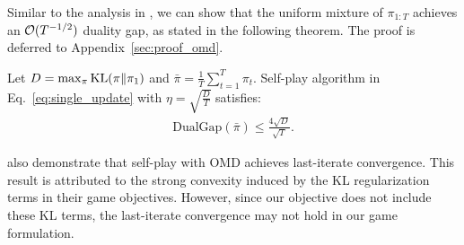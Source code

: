 
Similar to the analysis in \citet{zhang2024iterative}, we can show that the uniform mixture of $\pi_{1:T}$ achieves an $\mathcal O(T^{-1/2})$ duality gap, as stated in the following theorem. The proof is deferred to Appendix~\ref{sec:proof_omd}.
\begin{theorem}\label{thm:omd_guarantee}
Let $D=\max_{\pi} \mathrm{KL}(\pi \Vert \pi_1)$ and $\bar \pi=\frac{1}{T}\sum_{t=1}^T \pi_t$. Self-play algorithm in Eq.~\eqref{eq:single_update} with $\eta=\sqrt{\frac{D}{T}}$ satisfies:
\begin{align*}
\mathrm{DualGap}(\bar \pi) \le \frac{4\sqrt{D}}{\sqrt{T}}.
\end{align*}
\end{theorem}
\citet{zhang2024iterative} also demonstrate that self-play with OMD achieves last-iterate convergence. This result is attributed to the strong convexity induced by the KL regularization terms in their game objectives. However, since our objective does not include these KL terms, the last-iterate convergence may not hold in our game formulation.

